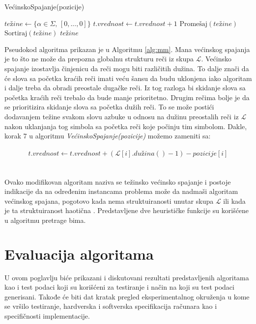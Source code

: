 \documentclass[12pt,oneside]{memoir}
\begin{document}
\begin{algorithm}
  \caption{\textrm{VećinskoSpajanje(pozicije)}}
  \label{alg:mm}
  \begin{algorithmic}[1]
  \State $te\textrm{ž}ine \gets \{\alpha \in \Sigma\textrm{, }[0,...,0] \}$ 
  \State
          \State $t.vrednost \gets t.vrednost + 1$
        \EndIf 
      \EndFor
    \EndIf 
  \EndFor
  \State
  \State $\textrm{Promešaj}(te\textrm{ž}ine)$
  \State $\textrm{Sortiraj}(te\textrm{ž}ine)$
  \State
  \State \Return $te\textrm{ž}ine$
  \end{algorithmic}
  \end{algorithm}

Pseudokod algoritma prikazan je u Algoritmu \ref{alg:mm}.
Mana većinskog spajanja je to što ne može da prepozna globalnu strukturu reči iz skupa $\mathcal{L}$.
Većinsko spajanje izostavlja činjenicu da reči mogu biti različitih dužina. To dalje 
znači da će slova sa početka kraćih reči imati veću šansu da budu uklonjena iako algoritam i dalje treba
da obradi preostale dugačke reči. Iz tog razloga bi skidanje slova sa početka kraćih reči trebalo da bude
manje prioritetno. Drugim rečima bolje je da se prioritizira skidanje slova sa početka dužih reči.
To se može postići dodavanjem težine svakom slovu azbuke u odnosu na dužinu preostalih reči iz $\mathcal{L}$ 
nakon uklanjanja tog simbola sa početka reči koje počinju tim simbolom. Dakle, korak 7 u algoritmu \textit{VećinskoSpajanje(pozicije)}
možemo zameniti sa:
\\
\\
\begin{equation}
  \label{eqn:wmm}
  t.vrednost \gets t.vrednost + (\mathcal{L}[i].du\textrm{ž}ina() - 1) - pozicije[i]
\end{equation}
\\
\\
Ovako modifikovan algoritam naziva se težinsko većinsko spajanje i postoje indikacije da na određenim instancama
problema može da nadmaši algoritam većinskog spajana, pogotovo kada nema struktuiranosti unutar skupa $\mathcal{L}$
ili kada je ta struktuiranost haotična \cite{ProbabilisticBS}. Predstavljene dve heurističke
funkcije su korišćene u algoritmu pretrage bima.

\chapter{Evaluacija algoritama}
\label{chap:evaluacijaAlg}
U ovom poglavlju biće prikazani i diskutovani rezultati predstavljenih algoritama
kao i test podaci koji su korišćeni za testiranje i način na koji su test podaci generisani.
Takođe će biti dat kratak pregled eksperimentalnog okruženja u kome se vršilo testiranje,
hardverska i softverska specifikacija računara kao i specifičnosti implementacije.
\end{document}
